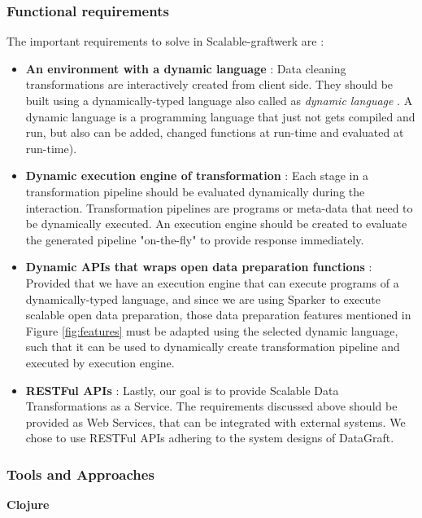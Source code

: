 \subsubsection{Functional requirements}
\label{engine-req}
The important requirements to solve in Scalable-graftwerk are :
\begin{itemize}
\item \textbf{An environment with a dynamic language} : Data cleaning transformations are interactively created from client side. They should be built using a dynamically-typed language also called as \textit{dynamic language }. A dynamic language is a programming language that just not gets compiled and run, but also can be added, changed functions at run-time and evaluated at run-time). 
\item \textbf{Dynamic execution engine of transformation} :  Each stage in a transformation pipeline should be evaluated dynamically during the interaction. Transformation pipelines are programs or meta-data that need to be dynamically executed. An execution engine should be created to evaluate the generated pipeline "on-the-fly" to provide response immediately.
\item \textbf{Dynamic APIs that wraps open data preparation functions} : Provided that we have an execution engine that can execute programs of a dynamically-typed language, and since we are using Sparker to execute scalable open data preparation, those data preparation features mentioned in Figure \ref{fig:features} must be adapted using the selected dynamic language, such that it can be used to dynamically create  transformation pipeline and executed by execution engine.
\item \textbf{RESTFul APIs} :  Lastly, our goal is to provide Scalable Data Transformations as a Service. The requirements discussed above should be provided as Web Services, that can be integrated with external systems. We chose to use RESTFul APIs adhering to the system designs of DataGraft. 
\end{itemize}
\subsubsection{Tools and Approaches}

\textbf{Clojure}


